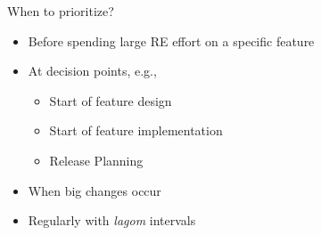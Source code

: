 \begin{Slide}{When to prioritize?}
\begin{itemize}
\item Before spending large RE effort on a specific feature
\item At decision points, e.g.,
\begin{itemize}
\item Start of feature design
\item Start of feature implementation
\item Release Planning
\end{itemize}
\item When big changes occur
\item Regularly with \textit{lagom} intervals


\end{itemize}
\end{Slide}